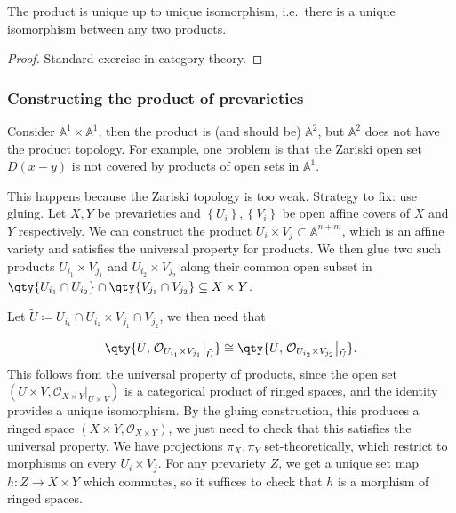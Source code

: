 \begin{proposition}[?]

The product is unique up to unique isomorphism, i.e.~there is a unique
isomorphism between any two products.

\end{proposition}

\begin{proof}

Standard exercise in category theory.

\end{proof}

\hypertarget{constructing-the-product-of-prevarieties}{%
\subsubsection{Constructing the product of
prevarieties}\label{constructing-the-product-of-prevarieties}}

\begin{example}

Consider \({\mathbb{A}}^1 \times {\mathbb{A}}^1\), then the product is
(and should be) \({\mathbb{A}}^2\), but \({\mathbb{A}}^2\) does not have
the product topology. For example, one problem is that the Zariski open
set \(D(x-y)\) is not covered by products of open sets in
\({\mathbb{A}}^1\).

\end{example}

This happens because the Zariski topology is too weak. Strategy to fix:
use gluing. Let \(X, Y\) be prevarieties and
\(\left\{{U_i}\right\}, \left\{{V_i}\right\}\) be open affine covers of
\(X\) and \(Y\) respectively. We can construct the product
\(U_i \times V_j \subset {\mathbb{A}}^{n+m}\), which is an affine
variety and satisfies the universal property for products. We then glue
two such products \(U_{i_1} \times V_{j_1}\) and
\(U_{i_2} \times V_{j_2}\) along their common open subset in
\(\qty{U_{i_1}\cap U_{i_2} }\cap\qty{V_{j_1} \cap V_{j_2}} \subseteq X\times Y\).

Let
\(\tilde U \coloneqq U_{i_1} \cap U_{i_2} \times V_{j_1} \cap V_{j_2}\),
we then need that

\begin{align*}  
\qty{ \tilde U, { \left.{{ {\mathcal{O}}_{U_{i_1} \times V_{j_1}} }} \right|_{{\tilde U}} } } \cong
\qty{ \tilde U, { \left.{{ {\mathcal{O}}_{U_{i_2} \times V_{j_2}} }} \right|_{{\tilde U}} } }
.\end{align*}
This follows from the universal property of products, since the open set
\((U\times V, { \left.{{ {\mathcal{O}}_{X\times Y} }} \right|_{{U\times V}} } )\)
is a categorical product of ringed spaces, and the identity provides a
unique isomorphism. By the gluing construction, this produces a ringed
space \((X\times Y, {\mathcal{O}}_{X\times Y})\), we just need to check
that this satisfies the universal property. We have projections
\(\pi_X, \pi_Y\) set-theoretically, which restrict to morphisms on every
\(U_i \times V_j\). For any prevariety \(Z\), we get a unique set map
\(h:Z\to X\times Y\) which commutes, so it suffices to check that \(h\)
is a morphism of ringed spaces.

